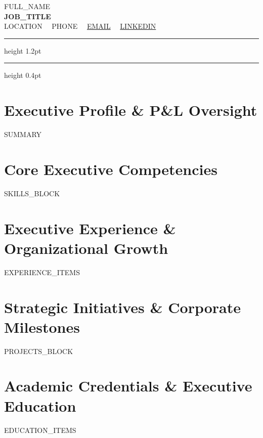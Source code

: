 \documentclass[10pt,letterpaper]{article}
\begin{document}
\begin{center}
  {\Huge \textsc{{{FULL_NAME}}}} \\[4pt]
  {\normalsize \textbf{{{JOB_TITLE}}}} \\[6pt]
  \small
  {{LOCATION}} \ \textperiodcentered \ 
  {{PHONE}} \ \textperiodcentered \ 
  \href{mailto:{{EMAIL}}}{{{EMAIL}}} \ \textperiodcentered \ 
  \href{https://{{LINKEDIN}}}{{{LINKEDIN}}}
\end{center}

\vspace{2pt}
\hrule height 1.2pt
\vspace{1.5pt}
\hrule height 0.4pt
\vspace{6pt}

\section{Executive Profile \& P\&L Oversight}
\small
{{SUMMARY}}

\section{Core Executive Competencies}
\small
{{SKILLS_BLOCK}}

\section{Executive Experience \& Organizational Growth}
\small
{{EXPERIENCE_ITEMS}}

\section{Strategic Initiatives \& Corporate Milestones}
\small
{{PROJECTS_BLOCK}}

\section{Academic Credentials \& Executive Education}
\small
{{EDUCATION_ITEMS}}
\end{document}
